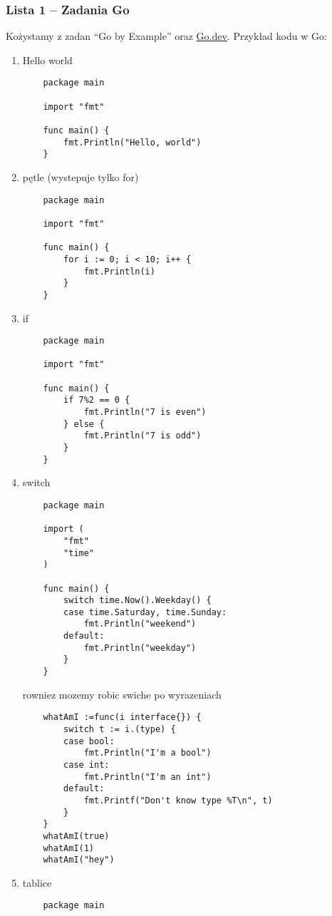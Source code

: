 \documentclass[11pt,a4paper]{article}
\begin{document}
\subsubsection{Lista 1 -- Zadania Go}
Kożystamy z zadan ``Go by Example'' oraz \href{https://go.dev/}{Go.dev}.
Przykład kodu w Go:
\begin{enumerate}
\item Hello world \begin{verbatim}
    package main

    import "fmt"

    func main() {
        fmt.Println("Hello, world")
    }
    \end{verbatim}
\item pętle (wystepuje tylko for) \begin{verbatim}
    package main

    import "fmt"

    func main() {
        for i := 0; i < 10; i++ {
            fmt.Println(i)
        }
    }
    \end{verbatim}
\item if \begin{verbatim}
    package main

    import "fmt"

    func main() {
        if 7%2 == 0 {
            fmt.Println("7 is even")
        } else {
            fmt.Println("7 is odd")
        }
    }
    \end{verbatim}
\item switch \begin{verbatim}
    package main

    import (
        "fmt"
        "time"
    )

    func main() {
        switch time.Now().Weekday() {
        case time.Saturday, time.Sunday:
            fmt.Println("weekend")
        default:
            fmt.Println("weekday")
        }
    }
    \end{verbatim}
    rowniez mozemy robic swiche po wyrazeniach
    \begin{verbatim}
    whatAmI :=func(i interface{}) {
        switch t := i.(type) {
        case bool:
            fmt.Println("I'm a bool")
        case int:
            fmt.Println("I'm an int")
        default:
            fmt.Printf("Don't know type %T\n", t)
        }
    }
    whatAmI(true)
    whatAmI(1)
    whatAmI("hey")
    \end{verbatim}
\item tablice \begin{verbatim}
    package main


\end{verbatim}
\end{enumerate}
\end{document}

